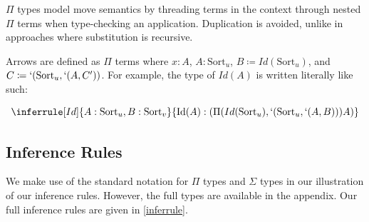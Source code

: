 \documentclass{article}
\newcommand{\sort}[1]{\text{Sort}_{#1}}
\newcommand{\comb}[2]{#1(#2)}
\begin{document}
\(\Pi\) types model move semantics by threading terms in the context through nested \(\Pi\) terms when type-checking an application. Duplication is avoided, unlike in approaches where substitution is recursive.

Arrows are defined as \(\Pi\) terms where \(x : A\), \(A : \sort{u}\), \(B \coloneq \comb{Id}{\sort{u}}\), and \(C \coloneq `(\sort{u}, `(A, C'))\). For example, the type of \(\comb{Id}{A}\) is written literally like such:

\begin{equation}
  \inferrule[Id]
  {A : \sort{u}, B : \sort{v}}
  {\text{Id}(A) : (\Pi(\comb{Id}{\sort{u}}, `(\sort{u}, `(A, B))) A)}
\end{equation}

\subsection{Inference Rules}

We make use of the standard notation for \(\Pi\) types and \(\Sigma\) types in our illustration of our inference rules. However, the full types are available in the appendix. Our full inference rules are given in \ref{inferrule}.
\end{document}

